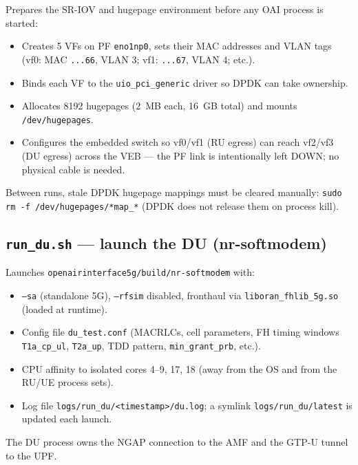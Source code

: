 \documentclass[11pt,a4paper]{article}
\begin{document}
Prepares the SR-IOV and hugepage environment before any OAI process is started:
\begin{itemize}[leftmargin=1.4em]
\item Creates 5 VFs on PF \texttt{eno1np0}, sets their MAC addresses and VLAN tags
  (vf0: MAC \texttt{...66}, VLAN 3; vf1: \texttt{...67}, VLAN 4; etc.).
\item Binds each VF to the \texttt{uio\_pci\_generic} driver so DPDK can take ownership.
\item Allocates 8192 hugepages (2~MB each, 16~GB total) and mounts
  \texttt{/dev/hugepages}.
\item Configures the embedded switch so vf0/vf1 (RU egress) can reach vf2/vf3 (DU egress)
  across the VEB --- the PF link is intentionally left DOWN; no physical cable is needed.
\end{itemize}

Between runs, stale DPDK hugepage mappings must be cleared manually:
\texttt{sudo rm -f /dev/hugepages/*map\_*} (DPDK does not release them on process kill).

\subsection{\texttt{run\_du.sh} --- launch the DU (nr-softmodem)}

Launches \texttt{openairinterface5g/build/nr-softmodem} with:
\begin{itemize}[leftmargin=1.4em]
\item \texttt{--sa} (standalone 5G), \texttt{--rfsim} disabled, fronthaul via
  \texttt{liboran\_fhlib\_5g.so} (loaded at runtime).
\item Config file \texttt{du\_test.conf} (MACRLCs, cell parameters, FH timing windows
  \texttt{T1a\_cp\_ul}, \texttt{T2a\_up}, TDD pattern, \texttt{min\_grant\_prb}, etc.).
\item CPU affinity to isolated cores 4--9, 17, 18 (away from the OS and from the RU/UE
  process sets).
\item Log file \texttt{logs/run\_du/<timestamp>/du.log}; a symlink
  \texttt{logs/run\_du/latest} is updated each launch.
\end{itemize}
The DU process owns the NGAP connection to the AMF and the GTP-U tunnel to the UPF.

\end{document}
